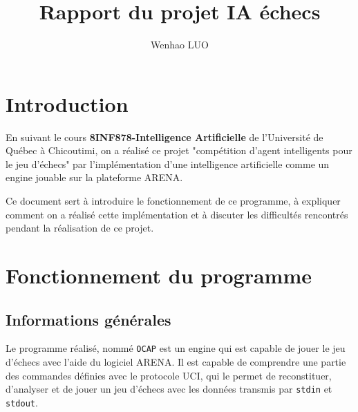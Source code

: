 \documentclass{article}
\author{Wenhao LUO}
\title{Rapport du projet IA échecs}
\begin{document}
\maketitle
\date{}

\cleardoublepage
\tableofcontents

\clearpage

\section{Introduction}
\par En suivant le cours \textbf{8INF878-Intelligence Artificielle} de l'Université de Québec à Chicoutimi, on a réalisé ce projet "compétition d'agent intelligents pour le jeu d'échecs" par l'implémentation d'une intelligence artificielle comme un engine jouable sur la plateforme ARENA.

\par Ce document sert à introduire le fonctionnement de ce programme, à expliquer comment on a réalisé cette implémentation et à discuter les difficultés rencontrés pendant la réalisation de ce projet.

\section{Fonctionnement du programme}

\subsection{Informations générales}
\par Le programme réalisé, nommé \texttt{OCAP} est un engine qui est capable de jouer le jeu d'échecs avec l'aide du logiciel ARENA. Il est capable de comprendre une partie des commandes définies avec le protocole UCI, qui le permet de reconstituer, d'analyser et de jouer un jeu d'échecs avec les données transmis par \texttt{stdin} et \texttt{stdout}.
\end{document}
